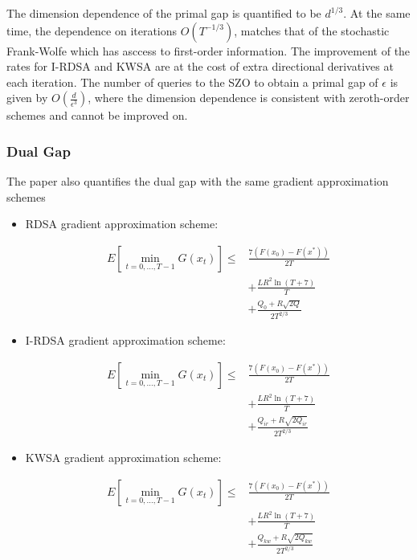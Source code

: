 \documentclass[10pt,twocolumn,letterpaper]{article}
\begin{document}
The dimension dependence of the primal gap is quantified to be
$d^{1 / 3}$. At the same time, the dependence on iterations
$O\left(T^{-1 / 3}\right)$, matches that of the stochastic 
Frank-Wolfe which has asccess to first-order information. 
The improvement of the rates for I-RDSA and KWSA are at the cost of
extra directional derivatives at each iteration.
The number of queries to the SZO to obtain a primal gap of $\epsilon$ is given by 
$O\left(\frac{d}{\epsilon^{3}}\right)$, where the dimension dependence
is consistent with zeroth-order schemes and cannot be improved on.

\subsubsection{Dual Gap}

The paper also quantifies the dual gap with the same gradient approximation schemes

\begin{itemize}
\item {RDSA gradient approximation scheme:

\[
\begin{aligned}
E\left[\min _{t=0, \ldots, T-1} G\left(x_{t}\right)\right] \leq & \frac{7\left(F\left(x_{0}\right)-F\left(x^{*}\right)\right)}{2 T} \\
& +\frac{L R^{2} \ln (T+7)}{T} \\
& +\frac{Q_{0}+R \sqrt{2 Q}}{2 T^{2 / 3}}
\end{aligned}
\]
}

\item {I-RDSA gradient approximation scheme:

\[
\begin{aligned}
E\left[\min _{t=0, \ldots, T-1} G\left(x_{t}\right)\right] \leq & \frac{7\left(F\left(x_{0}\right)-F\left(x^{*}\right)\right)}{2 T} \\
& +\frac{L R^{2} \ln (T+7)}{T} \\
& +\frac{Q_{i r}+R \sqrt{2 Q_{i r}}}{2 T^{2 / 3}}
\end{aligned}
\]
}

\item {KWSA gradient approximation scheme:

\[
\begin{aligned}
E\left[\min _{t=0, \ldots, T-1} G\left(x_{t}\right)\right] \leq & \frac{7\left(F\left(x_{0}\right)-F\left(x^{*}\right)\right)}{2 T} \\
& +\frac{L R^{2} \ln (T+7)}{T} \\
& +\frac{Q_{k w}+R \sqrt{2 Q_{k w}}}{2 T^{2 / 3}}
\end{aligned}
\]
}

\end{itemize}
\end{document}
